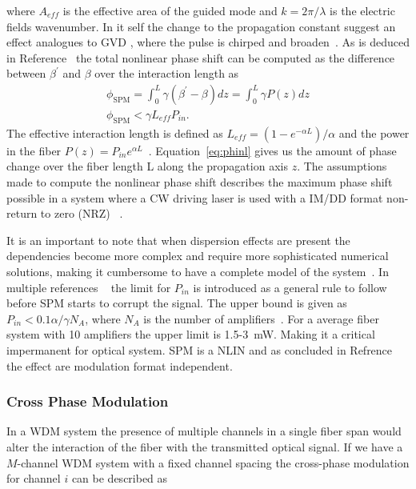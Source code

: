 where $A_{eff}$ is the effective area of the guided mode and $k=2\pi/\lambda$ is the electric fields wavenumber. In it self the change to the propagation constant suggest an effect analogues to GVD , where the pulse is chirped and broaden~\cite{agrawal2000nonlinear}. As is deduced in Reference~\cite{le2015advanced} the total nonlinear phase shift can be computed as the difference between $\beta^\prime$ and $\beta$ over the interaction length as  
\begin{subequations}
\begin{gather}
\phi_{\text{SPM}}=\int_0^L\gamma(\beta^\prime-\beta)dz=\int_0^L\gamma P(z)dz\\
\phi_{\text{SPM}}<\gamma L_{eff}P_{in}.
\end{gather}
\label{eq:phinl}
\end{subequations}
The effective interaction length is defined as $L_{eff}=(1-e^{-\alpha L})/\alpha$ and the power in the fiber $P(z)=P_{in}e^{\alpha L}$~\cite{le2015advanced}. Equation~\ref{eq:phinl} gives us the amount of phase change over the fiber length L along the propagation axis $z$. The assumptions made to compute the nonlinear phase shift describes the maximum phase shift possible in a system where a CW driving laser is used with a IM/DD format non-return to zero (NRZ) ~\cite{agrawal2001applications,FiberAgrawal,le2015advanced}. 

It is an important to note that when dispersion effects are present the dependencies become more complex and require more sophisticated numerical solutions, making it cumbersome to have a complete model of the system~\cite{agrawal2001applications,gordon1990phase}.  In multiple references ~\cite{le2015advanced,FiberAgrawal,agrawal2000nonlinear} the limit for $P_{in}$ is introduced as a general rule to follow before SPM starts to corrupt the signal.  The upper bound  is given as $P_{in}<0.1\alpha/\gamma N_{A}$, where $N_{A}$ is the number of amplifiers~\cite{le2015advanced}. For  a average fiber system with 10 amplifiers the upper limit is 1.5-3~mW. Making it a critical impermanent for optical system. SPM is a NLIN and as concluded in Refrence~\cite{dris2017analysis} the effect are modulation format independent.



\subsubsection{Cross Phase Modulation}
In a WDM system the presence of multiple channels in a single fiber span would alter the interaction of the fiber with the transmitted optical signal.  If we have a  $M$-channel WDM system with a fixed channel spacing the cross-phase modulation for channel $i$ can be described as
 
